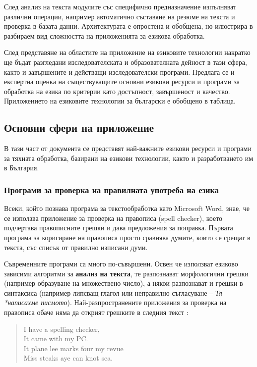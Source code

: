 \documentclass[]{../../metanetpaper}
\begin{document}
\begin{multicols}{2}
След анализ на текста модулите със специфично предназначение изпълняват различни операции, например автоматично съставяне на резюме на текста и проверка в базата данни. Архитектурата е опростена и обобщена, но илюстрира в разбираем вид сложността на приложенията за езикова обработка. 

След представяне на областите на приложение на езиковите технологии накратко ще бъдат разгледани изследователската и образователната дейност в тази сфера, както и завършените и действащи изследователски програми. Предлага се  и експертна оценка на съществуващите основни езикови ресурси и програми за обработка на езика по критерии като достъпност, завършеност и качество. Приложението на езиковите технологии за български е обобщено в таблица.

\subsection{Основни сфери на приложение}

В тази част от документа се представят най-важните езикови ресурси и програми за тяхната обработка, базирани на езикови технологии, както и разработването им в България. 

\subsubsection{Програми за проверка на правилната употреба на езика}

Всеки, който познава програма за текстообработка като Microsoft Word, знае, че се използва приложение за проверка на правописа (spell checker), което подчертава правописните грешки и дава предложения за поправка. Първата програма за коригиране на правописа просто сравнява думите, които се срещат в текста, със списък от правилно изписани думи. 

Съвременните програми са много по-съвършени. Освен че използват
езиково зависими алгоритми за \textbf{анализ на текста}, те разпознават
морфологични грешки (например образуване на множествено число), а
някои разпознават и грешки в синтаксиса (например липсващ глагол или
неправилно съгласуване -- {\it Тя *написахме
  писмото}). Най-разпространените приложения за проверка на правописа
обаче няма да открият грешките в следния текст \cite{zar1}: 

\begin{quote}
  I have a spelling checker,\\
  It came with my PC.\\
  It plane lee marks four my revue\\
  Miss steaks aye can knot sea.
\end{quote}


\end{multicols}
\end{document}
